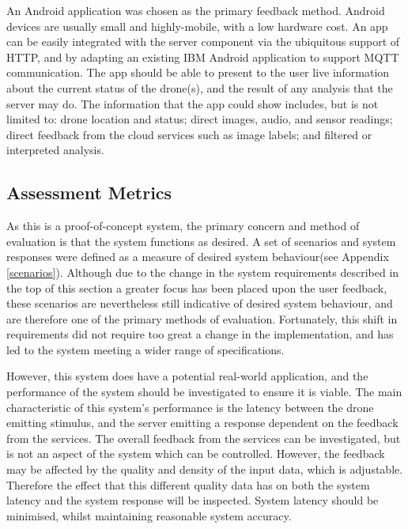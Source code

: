 \documentclass{article}
\begin{document}
An Android application was chosen as the primary feedback method. Android devices are usually small and highly-mobile, with a low hardware cost. An app can be easily integrated with the server component via the ubiquitous support of HTTP, and by adapting an existing IBM Android application to support MQTT communication\cite{iotStarterAndroid}. The app should be able to present to the user live information about the current status of the drone(s), and the result of any analysis that the server may do. The information that the app could show includes, but is not limited to: drone location and status; direct images, audio, and sensor readings; direct feedback from the cloud services such as image labels; and filtered or interpreted analysis.

\subsection{Assessment Metrics}
As this is a proof-of-concept system, the primary concern and method of evaluation is that the system functions as desired. A set of scenarios and system responses were defined as a measure of desired system behaviour(see Appendix \ref{scenarios}). Although due to the change in the system requirements described in the top of this section a greater focus has been placed upon the user feedback, these scenarios are nevertheless still indicative of desired system behaviour, and are therefore one of the primary methods of evaluation. Fortunately, this shift in requirements did not require too great a change in the implementation, and has led to the system meeting a wider range of specifications.

However, this system does have a potential real-world application, and the performance of the system should be investigated to ensure it is viable. The main characteristic of this system's performance is the latency between the drone emitting stimulus, and the server emitting a response dependent on the feedback from the services. The overall feedback from the services can be investigated, but is not an aspect of the system which can be controlled. However, the feedback may be affected by the quality and density of the input data, which is adjustable. Therefore the effect that this different quality data has on both the system latency and the system response will be inspected. System latency should be minimised, whilst maintaining reasonable system accuracy.
\end{document}
